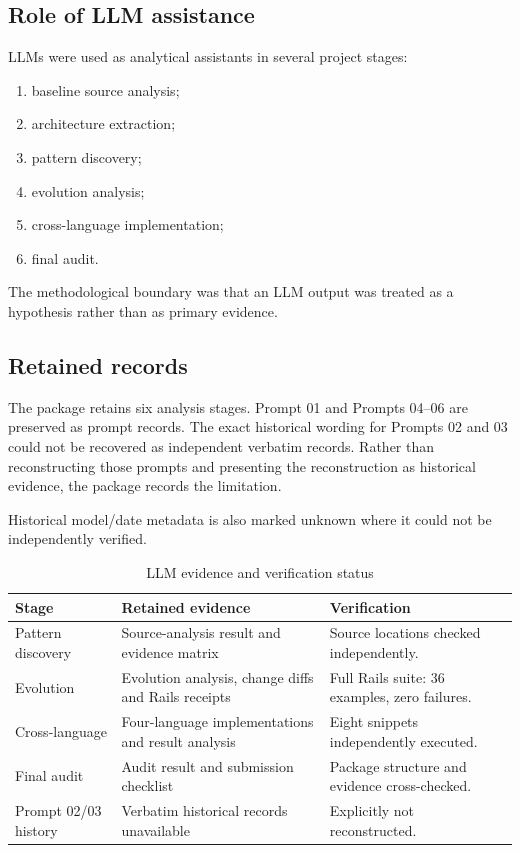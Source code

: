 \documentclass[10pt,a4paper]{article}
\begin{document}
\subsection{Role of LLM assistance}

LLMs were used as analytical assistants in several project stages:

\begin{enumerate}[leftmargin=*]
\item baseline source analysis;
\item architecture extraction;
\item pattern discovery;
\item evolution analysis;
\item cross-language implementation;
\item final audit.
\end{enumerate}

The methodological boundary was that an LLM output was treated as a hypothesis rather than as primary evidence.



\subsection{Retained records}

The package retains six analysis stages. Prompt 01 and Prompts 04--06 are preserved as prompt records. The exact historical wording for Prompts 02 and 03 could not be recovered as independent verbatim records. Rather than reconstructing those prompts and presenting the reconstruction as historical evidence, the package records the limitation.

Historical model/date metadata is also marked unknown where it could not be independently verified.

\begin{table}[H]
\centering
\caption{LLM evidence and verification status}
\label{tab:llm}
\begin{tabularx}{\linewidth}{lXX}
\toprule
Stage & Retained evidence & Verification\\
\midrule
Pattern discovery & Source-analysis result and evidence matrix & Source locations checked independently.\\
Evolution & Evolution analysis, change diffs and Rails receipts & Full Rails suite: 36 examples, zero failures.\\
Cross-language & Four-language implementations and result analysis & Eight snippets independently executed.\\
Final audit & Audit result and submission checklist & Package structure and evidence cross-checked.\\
Prompt 02/03 history & Verbatim historical records unavailable & Explicitly not reconstructed.\\
\bottomrule
\end{tabularx}
\end{table}
\end{document}
